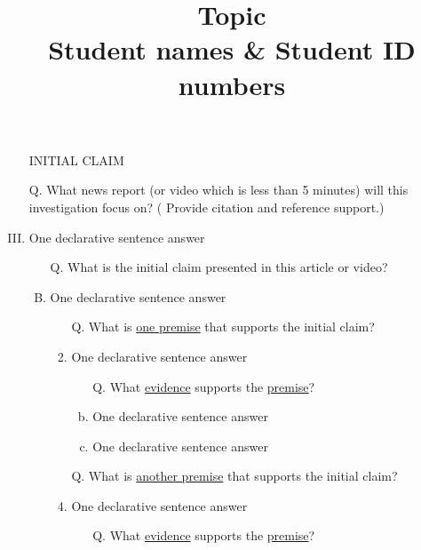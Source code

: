 \documentclass[a4paper, 12pt]{article}
\title{Topic\\
\small
Student names \& Student ID numbers
}
\date{}
\begin{document}
\maketitle
\begin{enumerate}[I.]
    \item[]{\color{blue}INITIAL CLAIM}
    \item[Q.] {What news report (or video which is less than 5 minutes) will this investigation focus on? (
          Provide citation and reference support.)}
    \item{\color{gray} One declarative sentence answer} %
          \begin{enumerate}[A.]
              \item [Q.] What is the {\color{blue}initial claim} presented in this article or video?
              \item {\color{gray} One declarative sentence answer} %
                    \begin{enumerate}[1.]
                        \item[Q.] What is \underline{one premise} that supports the {\color{blue}initial claim}?
                        \item{\color{gray} One declarative sentence answer} %
                              \begin{enumerate}[a.]
                                  \item [Q.] What \underline{evidence} supports the \underline{premise}?
                                  \item {\color{gray} One declarative sentence answer} %
                                  \item {\color{gray} One declarative sentence answer} %
                              \end{enumerate}
                        \item [Q.] What is \underline{another premise} that supports the {\color{blue}initial claim}?
                        \item{\color{gray} One declarative sentence answer} %
                              \begin{enumerate}[a.]
                                  \item [Q.] What \underline{evidence} supports the \underline{premise}?

\end{enumerate}
\end{enumerate}
\end{enumerate}
\end{enumerate}
\end{document}
